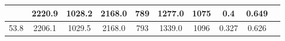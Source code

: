 \documentclass[a4paper,12pt]{article}
\begin{document}
\begin{longtable}{
     |
%    
    c|
%    
    c|
%    
    c|
%    
    c|
%    
    c|
%    
    c|
%    
    c|
%    
    c|
%    
    c|
%    
    c|
%    
    }
%        
        & 2220.9
%        

%        

%        
        & 1028.2
%        

%        

%        
        & 2168.0
%        

%        

%        
        & 789
%        

%        

%        
        & 1277.0
%        

%        

%        
        & 1075
%        

%        

%        
        & 0.4
%        

%        

%        
        & 0.649
%        

%        
        \\
        \hline

        

%        

%        
        53.8
%        

%        

%        
        & 2206.1
%        

%        

%        
        & 1029.5
%        

%        

%        
        & 2168.0
%        

%        

%        
        & 793
%        

%        

%        
        & 1339.0
%        

%        

%        
        & 1096
%        

%        

%        
        & 0.327
%        

%        

%        
        & 0.626
%        

%        
        \\
        \hline

        
    \end{longtable}
%    
\end{document}
